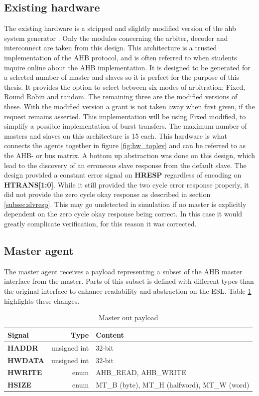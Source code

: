 \subsection{Existing hardware}
\label{sub:exist}
The existing hardware is a stripped and slightly modified version of the ahb system generator \cite{ahbsys}. Only the modules concerning the arbiter, decoder and interconnect are taken from this design. This architecture is a trusted implementation of the AHB protocol, and is often referred to when students inquire online about the AHB implementation. It is designed to be generated for a selected number of master and slaves so it is perfect for the purpose of this thesis. It provides the option to select between six modes of arbitration; Fixed, Round Robin and random. The remaining three are the modified versions of these. With the modified version a grant is not taken away when first given, if the request remains asserted. This implementation will be using Fixed modified, to simplify a possible implementation of burst transfers. The maximum number of masters and slaves on this architecture is 15 each. This hardware is what connects the agents together in figure \ref{fig:hw_toplev} and can be referred to as the AHB- or bus matrix. A bottom up abstraction was done on this design, which lead to the discovery of an erroneous slave response from the default slave. The design provided a constant error signal on \textbf{HRESP} regardless of encoding on \textbf{HTRANS[1:0]}. While it still provided the two cycle error response properly, it did not provide the zero cycle okay response as described in section \ref{subsec:slvresp}. This may go undetected in simulation if no master is explicitly dependent on the zero cycle okay response being correct. In this case it would greatly complicate verification, for this reason it was corrected.  
 
  
\subsection{Master agent}
The master agent receives a payload representing a subset of the AHB master interface from the master. Parts of this subset is defined with different types than the original interface to enhance readability and abstraction on the ESL. Table \ref{tab:mpayload} highlights these changes. 
\begin{table}[hbt] 
  \label{tab:mpayload}
  \begin{tabular}{|p{25mm}|r|p{10cm}|} 
  \hline
  \textbf{Signal} & \textbf{Type} & \textbf{Content} \\
    \hline
  \textbf{HADDR} & unsigned int & 32-bit \\
    \hline
  \textbf{HWDATA} & unsigned int & 32-bit \\
    \hline
  \textbf{HWRITE} & enum & AHB\_READ, AHB\_WRITE \\
    \hline  
\textbf{HSIZE} & enum & MT\_B (byte), MT\_H (halfword), MT\_W (word) \\
    \hline
  \end{tabular}
\caption{Master out payload}
\end{table}

